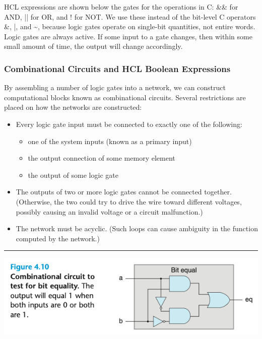 \documentclass[11pt]{article}
\begin{document}
HCL expressions are shown below the gates for the operations in C: \&\& for AND, || for OR, and ! for NOT. We use these instead of the bit-level C operators \&, |, and \textasciitilde{}, because logic gates operate on single-bit quantities, not entire words.\\

Logic gates are always active. If some input to a gate changes, then within some small amount of time, the output will change accordingly.\\

\subsubsection{Combinational Circuits and HCL Boolean Expressions}
\label{sec:orgff11743}
By assembling a number of logic gates into a network, we can construct computational blocks known as combinational circuits. Several restrictions are placed on how the networks are constructed:\\
\begin{itemize}
\item Every logic gate input must be connected to exactly one of the following:\\
\begin{itemize}
\item one of the system inputs (known as a primary input)\\
\item the output connection of some memory element\\
\item the output of some logic gate\\
\end{itemize}
\item The outputs of two or more logic gates cannot be connected together. (Otherwise, the two could try to drive the wire toward different voltages, possibly causing an invalid voltage or a circuit malfunction.)\\
\item The network must be acyclic. (Such loops can cause ambiguity in the function computed by the network.)\\
\end{itemize}

\noindent\rule{\textwidth}{0.5pt}
\begin{center}
\includegraphics[width=.9\linewidth]{pics/figure4.10-combinational-circuit-to-test-for-bit-equality.png}
\end{center}
\end{document}
